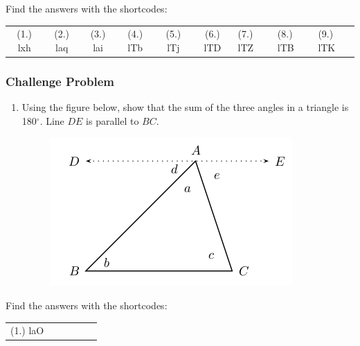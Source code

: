 \par {} Find the
answers with the shortcodes:
\par \begin{tabular}[h]{cccccc}
(1.) lxh  &  (2.) laq  &  (3.) lai  &  (4.) lTb  &  (5.) lTj  &  (6.) lTD  & 
(7.) lTZ  &  (8.) lTB  &  (9.) lTK  & \end{tabular}
\subsubsection{ Challenge Problem}
\begin{enumerate}[noitemsep, label=\textbf{\arabic*}. ] 
\item Using the figure below, show that the sum of the three angles in a
triangle is 180$^{\circ }$. Line $DE$ is parallel to $BC$.
\setcounter{subfigure}{0}
\begin{figure}[H] %
\begin{center}
\label{m39368*id320668!!!underscore!!!media}\label{
m39368*id320668!!!underscore!!!printimage}\includegraphics{
col11306.imgs/m39368_MG10C13_065.png} %
\vspace{2pt}
\vspace{.1in}
\end{center}
\end{figure}       \newline
\end{enumerate}

\par {} Find the
answers with the shortcodes:
\par \begin{tabular}[h]{cccccc}
(1.) laO  & \end{tabular}

